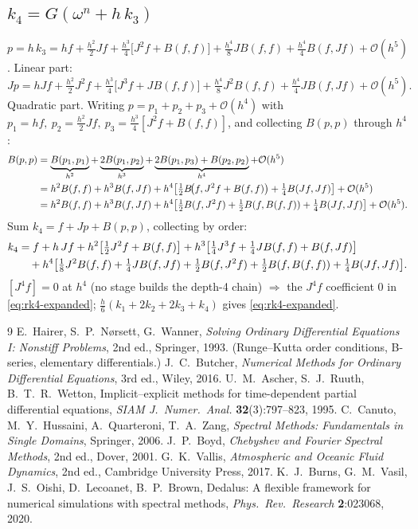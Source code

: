 \documentclass[11pt]{article}
\newcommand{\bO}{\mathcal{O}}
\begin{document}
\subsection{$k_4=G(\omega^n+h\,k_3)$}
$p=h\,k_3 = h f + \tfrac{h^2}{2}Jf + \tfrac{h^3}{4}\bigl[J^2f+B(f,f)\bigr]
 + \tfrac{h^4}{8}JB(f,f) + \tfrac{h^4}{4}B(f,Jf) + \bO(h^5)$. Linear part:
\begin{equation}
  Jp = h Jf + \tfrac{h^2}{2}J^2f + \tfrac{h^3}{4}\bigl[J^3f+JB(f,f)\bigr]
     + \tfrac{h^4}{8}J^2B(f,f) + \tfrac{h^4}{4}JB(f,Jf) + \bO(h^5).
\end{equation}
Quadratic part. Writing $p=p_1+p_2+p_3+\bO(h^4)$ with
$p_1=hf,\ p_2=\tfrac{h^2}{2}Jf,\ p_3=\tfrac{h^3}{4}[J^2f+B(f,f)]$, and collecting $B(p,p)$ through $h^4$:
\begin{align}
  B(p,p) &= \underbrace{B(p_1,p_1)}_{h^2}
   + \underbrace{2B(p_1,p_2)}_{h^3}
   + \underbrace{2B(p_1,p_3)+B(p_2,p_2)}_{h^4} + \bO(h^5)\notag\\
   &= h^2 B(f,f) + h^3 B(f,Jf)
   + h^4\!\left[\tfrac12 B\!\bigl(f,J^2f+B(f,f)\bigr) + \tfrac14 B(Jf,Jf)\right] + \bO(h^5)\notag\\
   &= h^2 B(f,f) + h^3 B(f,Jf)
   + h^4\!\left[\tfrac12 B(f,J^2f) + \tfrac12 B(f,B(f,f)) + \tfrac14 B(Jf,Jf)\right] + \bO(h^5).
\end{align}
Sum $k_4=f+Jp+B(p,p)$, collecting by order:
\begin{align}
  k_4 &= f + h\,Jf + h^2\bigl[\tfrac12 J^2f+B(f,f)\bigr]
       + h^3\bigl[\tfrac14 J^3f+\tfrac14 JB(f,f)+B(f,Jf)\bigr]\notag\\
      &\quad + h^4\bigl[\tfrac18 J^2B(f,f)+\tfrac14 JB(f,Jf)+\tfrac12 B(f,J^2f)+\tfrac12 B(f,B(f,f))+\tfrac14 B(Jf,Jf)\bigr].
\end{align}
$[J^4f]=0$ at $h^4$ (no stage builds the depth-4 chain) $\Rightarrow$ the $J^4f$ coefficient $0$
in \eqref{eq:rk4-expanded}; $\tfrac h6(k_1+2k_2+2k_3+k_4)$ gives \eqref{eq:rk4-expanded}.

\begin{thebibliography}{9}
 E.~Hairer, S.~P.~N{\o}rsett, G.~Wanner,
  \emph{Solving Ordinary Differential Equations I: Nonstiff Problems}, 2nd ed., Springer, 1993.
  (Runge--Kutta order conditions, B-series, elementary differentials.)
 J.~C.~Butcher,
  \emph{Numerical Methods for Ordinary Differential Equations}, 3rd ed., Wiley, 2016.
 U.~M.~Ascher, S.~J.~Ruuth, B.~T.~R.~Wetton,
  Implicit--explicit methods for time-dependent partial differential equations,
  \emph{SIAM J.\ Numer.\ Anal.} \textbf{32}(3):797--823, 1995.
 C.~Canuto, M.~Y.~Hussaini, A.~Quarteroni, T.~A.~Zang,
  \emph{Spectral Methods: Fundamentals in Single Domains}, Springer, 2006.
 J.~P.~Boyd,
  \emph{Chebyshev and Fourier Spectral Methods}, 2nd ed., Dover, 2001.
 G.~K.~Vallis,
  \emph{Atmospheric and Oceanic Fluid Dynamics}, 2nd ed., Cambridge University Press, 2017.
 K.~J.~Burns, G.~M.~Vasil, J.~S.~Oishi, D.~Lecoanet, B.~P.~Brown,
  Dedalus: A flexible framework for numerical simulations with spectral methods,
  \emph{Phys.\ Rev.\ Research} \textbf{2}:023068, 2020.
\end{thebibliography}
\end{document}
